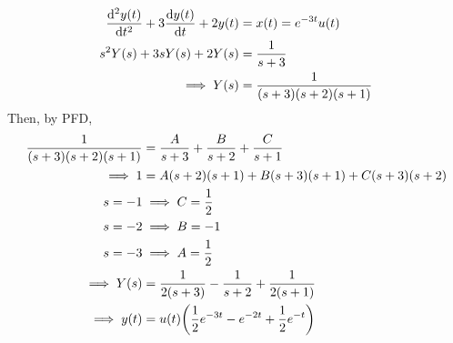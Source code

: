\documentclass{article}
\begin{document}
\begin{align}
    \dv[2]{y(t)}{t} + 3 \dv{y(t)}{t} + 2y(t) &= x(t) = e^{-3t} u(t) \\
    s^2 Y(s) + 3 s Y(s) + 2Y(s) &= \frac{1}{s + 3} \\
    \implies Y(s) &= \frac{1}{(s + 3) (s + 2) (s + 1)}
\end{align}
Then, by PFD,
\begin{align}
    \frac{1}{(s + 3) (s + 2) (s + 1)} &= \frac{A}{s + 3} + \frac{B}{s + 2} + \frac{C}{s + 1} \\
    \implies 1 &= A (s + 2) (s + 1) + B (s + 3) (s + 1) + C (s + 3) (s + 2) \\
    s = -1 &\implies C = \frac{1}{2} \\
    s = -2 &\implies B = -1 \\
    s = -3 &\implies A = \frac{1}{2} \\
    \implies Y(s) &= \frac{1}{2 (s + 3)} - \frac{1}{s + 2} + \frac{1}{2 (s + 1)} \\
    \implies y(t) &= u(t) \qty(\frac{1}{2} e^{-3t} - e^{-2t} + \frac{1}{2} e^{-t})
\end{align}
\end{document}
